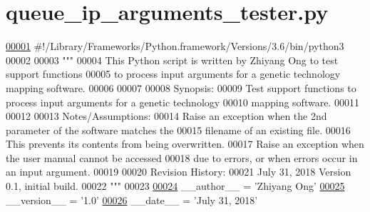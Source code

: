\hypertarget{queue__ip__arguments__tester_8py_source}{}\section{queue\+\_\+ip\+\_\+arguments\+\_\+tester.\+py}
\label{queue__ip__arguments__tester_8py_source}

\begin{DoxyCode}
\hypertarget{queue__ip__arguments__tester_8py_source_l00001}{}\hyperlink{namespaceutilities_1_1queue__ip__arguments__tester}{00001} \textcolor{comment}{#!/Library/Frameworks/Python.framework/Versions/3.6/bin/python3}
00002 
00003 \textcolor{stringliteral}{"""}
00004 \textcolor{stringliteral}{    This Python script is written by Zhiyang Ong to test support functions}
00005 \textcolor{stringliteral}{        to process input arguments for a genetic technology mapping software.}
00006 \textcolor{stringliteral}{}
00007 \textcolor{stringliteral}{}
00008 \textcolor{stringliteral}{    Synopsis:}
00009 \textcolor{stringliteral}{    Test support functions to process input arguments for a genetic technology}
00010 \textcolor{stringliteral}{        mapping software.}
00011 \textcolor{stringliteral}{}
00012 \textcolor{stringliteral}{}
00013 \textcolor{stringliteral}{    Notes/Assumptions:}
00014 \textcolor{stringliteral}{    Raise an exception when the 2nd parameter of the software matches the}
00015 \textcolor{stringliteral}{        filename of an existing file.}
00016 \textcolor{stringliteral}{        This prevents its contents from being overwritten.}
00017 \textcolor{stringliteral}{    Raise an exception when the user manual cannot be accessed}
00018 \textcolor{stringliteral}{        due to errors, or when errors occur in an input argument.}
00019 \textcolor{stringliteral}{}
00020 \textcolor{stringliteral}{    Revision History:}
00021 \textcolor{stringliteral}{    July 31, 2018           Version 0.1, initial build.}
00022 \textcolor{stringliteral}{"""}
00023 
\hypertarget{queue__ip__arguments__tester_8py_source_l00024}{}\hyperlink{namespaceutilities_1_1queue__ip__arguments__tester_a4613e6fdf0e66646ab9e6b2431f60697}{00024} \_\_author\_\_ = \textcolor{stringliteral}{'Zhiyang Ong'}
\hypertarget{queue__ip__arguments__tester_8py_source_l00025}{}\hyperlink{namespaceutilities_1_1queue__ip__arguments__tester_a37d1fc5c2ed863dec0b8ce969bc4ac4c}{00025} \_\_version\_\_ = \textcolor{stringliteral}{'1.0'}
\hypertarget{queue__ip__arguments__tester_8py_source_l00026}{}\hyperlink{namespaceutilities_1_1queue__ip__arguments__tester_abb3d4e36e816d047434e26922c0e28fe}{00026} \_\_date\_\_ = \textcolor{stringliteral}{'July 31, 2018'}

\end{DoxyCode}
